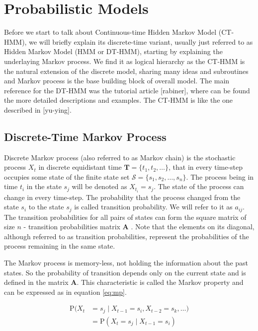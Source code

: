 \documentclass[thesis=M,english]{FITthesis}[2012/10/20]
\newcommand{\matr}[1]{\mathbf{#1}}
\begin{document}

\chapter{Probabilistic Models}

Before we start to talk about Continuous-time Hidden Markov Model (CT-HMM), we will briefly explain its discrete-time variant, usually just referred to as Hidden Markov Model (HMM or DT-HMM), starting by explaining the underlaying Markov process. We find it as logical hierarchy as the CT-HMM is the natural extension of the discrete model, sharing many ideas and subroutines and Markov process is the base building block of overall model. The main reference for the DT-HMM was the tutorial article [rabiner], where can be found the more detailed descriptions and examples. The CT-HMM is like the one described in [yu-ying].

\section{Discrete-Time Markov Process}\label{sec:DMP}
    
Discrete Markov process (also referred to as Markov chain) is the stochastic process $X_t$ in discrete equidistant time $\matr{T} = \{ t_1,t_2,\dots \}$, that in every time-step occupies some state of the finite state set $\mathcal{S} = \{ s_1, s_2, \dots, s_n\}$. The process being in time $t_i$ in the state $s_j$ will be denoted as $X_{t_i} = s_j$. The state of the process can change in every time-step. The probability that the process changed from the state $s_i$ to the state $s_j$ is called transition probability. We will refer to it as $a_{ij}$. The transition probabilities for all pairs of states can form the square matrix of size $n$ - transition probabilities matrix $\matr{A}$ . Note that the elements on its diagonal, although referred to as transition probabilities, represent the probabilities of the process remaining in the same state.

The Markov process is memory-less, not holding the information about the past states. So the probability of transition depends only on the current state and is defined in the matrix $\matr{A}$. This characteristic is called the Markov property and can be expressed as in equation \eqref{eq:mp}.

\begin{equation}\label{eq:mp}
\begin{aligned}
\mathrm{P}(X_t & = s_j \mid X_{t-1} = s_i, X_{t-2} = s_k, \dots)  \\   
               & = \mathrm{P}(X_t = s_j \mid X_{t-1} = s_i )
\end{aligned}
\end{equation}
\end{document}
